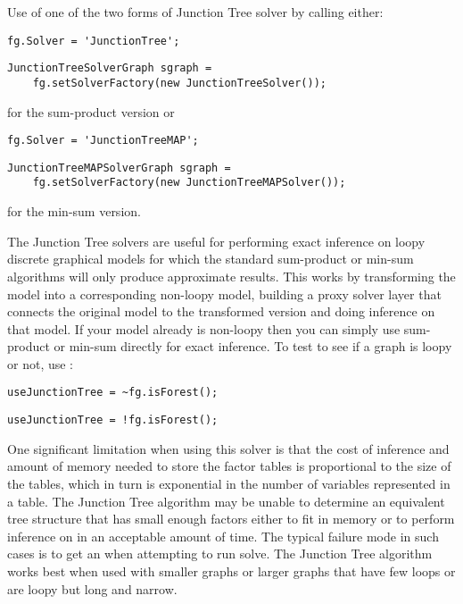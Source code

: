 Use of one of the two forms of Junction Tree solver by calling either:

\ifmatlab
\begin{lstlisting}
fg.Solver = 'JunctionTree';
\end{lstlisting}
\fi

\ifjava
\begin{lstlisting}
JunctionTreeSolverGraph sgraph =
    fg.setSolverFactory(new JunctionTreeSolver());
\end{lstlisting}
\fi

for the sum-product version or

\ifmatlab
\begin{lstlisting}
fg.Solver = 'JunctionTreeMAP';
\end{lstlisting}
\fi

\ifjava
\begin{lstlisting}
JunctionTreeMAPSolverGraph sgraph =
    fg.setSolverFactory(new JunctionTreeMAPSolver());
\end{lstlisting}
\fi

for the min-sum version.

The Junction Tree solvers are useful for performing exact inference on loopy discrete graphical models for which the standard sum-product or min-sum algorithms will only produce approximate results. This works by transforming the model into a corresponding non-loopy model, building a proxy solver layer that connects the original model to the transformed version and doing inference on that model. If your model already is non-loopy then you can simply use sum-product or min-sum directly for exact inference. To test to see if a graph is loopy or not, use :

\ifmatlab
\begin{lstlisting}
useJunctionTree = ~fg.isForest();
\end{lstlisting}
\fi

\ifjava
\begin{lstlisting}
useJunctionTree = !fg.isForest();
\end{lstlisting}
\fi

One significant limitation when using this solver is that the cost of inference and amount of memory needed to store the factor tables is proportional to the size of the tables, which in turn is exponential in the number of variables represented in a table. The Junction Tree algorithm may be unable to determine an equivalent tree structure that has small enough factors either to fit in memory or to perform inference on in an acceptable amount of time. The typical failure mode in such cases is to get an  when attempting to run solve. The Junction Tree algorithm works best when used with smaller graphs or larger graphs that have few loops or are loopy but long and narrow.

